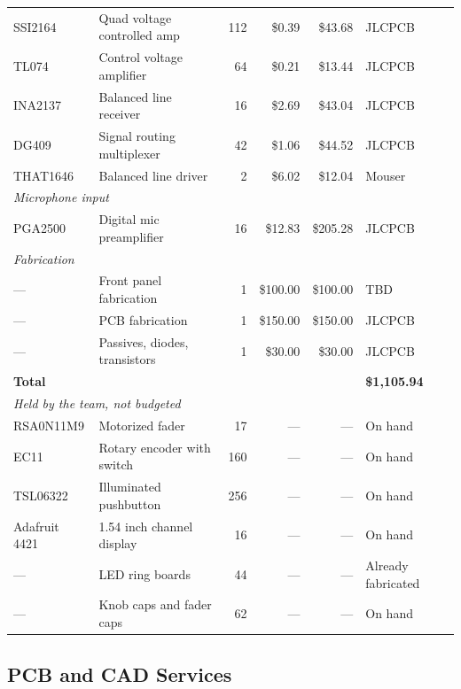 \documentclass[11pt, letterpaper,titlepage]{article}
\begin{document}
\begin{table}[H]
\begin{tabular}{l l r r r l}
SSI2164        & Quad voltage controlled amp    & 112 & \$0.39  & \$43.68  & JLCPCB \\
TL074          & Control voltage amplifier      & 64  & \$0.21  & \$13.44  & JLCPCB \\
INA2137        & Balanced line receiver         & 16  & \$2.69  & \$43.04  & JLCPCB \\
DG409          & Signal routing multiplexer     & 42  & \$1.06  & \$44.52  & JLCPCB \\
THAT1646       & Balanced line driver           & 2   & \$6.02  & \$12.04  & Mouser \\
\midrule
\multicolumn{6}{l}{\textit{Microphone input}} \\
PGA2500        & Digital mic preamplifier       & 16  & \$12.83 & \$205.28 & JLCPCB \\
\midrule
\multicolumn{6}{l}{\textit{Fabrication}} \\
---            & Front panel fabrication        & 1   & \$100.00 & \$100.00 & TBD \\
---            & PCB fabrication                & 1   & \$150.00 & \$150.00 & JLCPCB \\
---            & Passives, diodes, transistors  & 1   & \$30.00  & \$30.00  & JLCPCB \\
\midrule
\multicolumn{5}{l}{\textbf{Total}} & \textbf{\$1{,}105.94} \\
\midrule
\multicolumn{6}{l}{\textit{Held by the team, not budgeted}} \\
RSA0N11M9      & Motorized fader                & 17  & --- & --- & On hand \\
EC11           & Rotary encoder with switch     & 160 & --- & --- & On hand \\
TSL06322       & Illuminated pushbutton         & 256 & --- & --- & On hand \\
Adafruit 4421  & 1.54 inch channel display      & 16  & --- & --- & On hand \\
---            & LED ring boards                & 44  & --- & --- & Already fabricated \\
---            & Knob caps and fader caps       & 62  & --- & --- & On hand \\
\bottomrule
\end{tabular}
\end{table}


\subsection{PCB and CAD Services}
\end{document}
